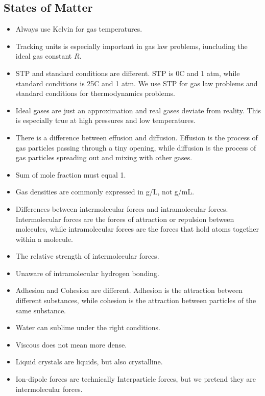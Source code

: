     \subsection{States of Matter}
            \begin{itemize}
                \item Always use Kelvin for gas temperatures.
                \item Tracking units is especially important in gas law problems, iuncluding the ideal gas constant $R$.
                \item STP and standard conditions are different. STP is 0\textdegree C and 1 atm, while standard conditions is 25\textdegree C and 1 atm. We use STP for gas law problems and standard conditions for thermodynamics problems.
                \item Ideal gases are just an approximation and real gases deviate from reality. This is especially true at high pressures and low temperatures.
                \item There is a difference between effusion and diffusion. Effusion is the process of gas particles passing through a tiny opening, while diffusion is the process of gas particles spreading out and mixing with other gases.
                \item Sum of mole fraction must equal 1. 
                \item Gas densities are commonly expressed in g/L, not g/mL. 
                \item Differences between intermolecular forces and intramolecular forces. Intermolecular forces are the forces of attraction or repulsion between molecules, while intramolecular forces are the forces that hold atoms together within a molecule.
                \item The relative strength of intermolecular forces.
                \item Unaware of intramolecular hydrogen bonding. 
                \item Adhesion and Cohesion are different. Adhesion is the attraction between different substances, while cohesion is the attraction between particles of the same substance.
                \item Water can sublime under the right conditions.
                \item Viscous does not mean more dense. 
                \item Liquid crystals are liquids, but also crystalline.
                \item Ion-dipole forces are technically Interparticle forces, but we pretend they are intermolecular forces.

\end{itemize}
